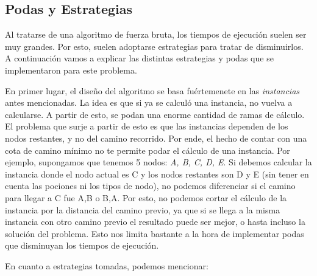 \subsection{Podas y Estrategias}

\par Al tratarse de una algoritmo de fuerza bruta, los tiempos de ejecución suelen ser muy grandes. Por esto, suelen adoptarse estrategias para tratar de disminuirlos. A continuación vamos a explicar las distintas estrategias y podas que se implementaron para este problema.

\par En primer lugar, el diseño del algoritmo se basa fuértemenete en las \textit{instancias} antes mencionadas. La idea es que si ya se calculó una instancia, no vuelva a calcularse. A partir de esto, se podan una enorme cantidad de ramas de cálculo. El problema que surje a partir de esto es que las instancias dependen de los nodos restantes, y no del camino recorrido. Por ende, el hecho de contar con una cota de camino mínimo no te permite podar el cálculo de una instancia. Por ejemplo, supongamos que tenemos 5 nodos: \textit{A, B, C, D, E}. Si debemos calcular la instancia donde el nodo actual es C y los nodos restantes son D y E (sin tener en cuenta las pociones ni los tipos de nodo), no podemos diferenciar si el camino para llegar a C fue A,B o B,A. Por esto, no podemos cortar el cálculo de la instancia por la distancia del camino previo, ya que si se llega a la misma instancia con otro camino previo el resultado puede ser mejor, o hasta incluso la solución del problema. Esto nos limita bastante a la hora de implementar podas que disminuyan los tiempos de ejecución.

\par En cuanto a estrategias tomadas, podemos mencionar:

